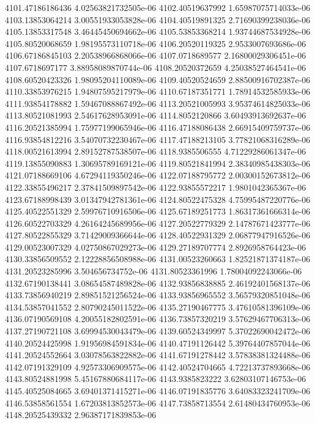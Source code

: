 {4101.47186186436 4.02563821732505e-06
4102.40519637992 1.65987075714033e-06
4103.13853064214 3.00551933053828e-06
4104.40519891325 2.71690399238036e-06
4105.13853317548 3.46445450694662e-06
4105.53853368214 1.93744687534928e-06
4105.80520068659 1.98195573110718e-06
4106.20520119325 2.9533007693686e-06
4106.67186845103 2.20538966868066e-06
4107.0718689577 2.16800029306451e-06
4107.6718697177 3.88958089870744e-06
4108.20520372659 4.25038527464541e-06
4108.60520423326 1.98095204110089e-06
4109.40520524659 2.88500916702387e-06
4110.33853976215 1.94807595217979e-06
4110.67187351771 1.78914532585933e-06
4111.93854178882 1.59467088867492e-06
4113.20521005993 3.95374614825033e-06
4113.80521081993 2.54617628953091e-06
4114.8052120866 3.60493913692637e-06
4116.20521385994 1.75977199065946e-06
4116.47188086438 2.66915409759737e-06
4116.93854812216 3.54070732230467e-06
4117.47188213105 3.77821068316289e-06
4118.00521613994 2.89152787538507e-06
4118.9385506555 4.71229286061347e-06
4119.13855090883 1.30695789169121e-06
4119.80521841994 2.38340985438303e-06
4121.07188669106 4.67294119350246e-06
4122.07188795772 2.00300152673812e-06
4122.33855496217 2.37841509897542e-06
4122.93855572217 1.9801042365367e-06
4123.67188998439 3.01347942781361e-06
4124.80522475328 4.75995487220776e-06
4125.40522551329 2.59976710916506e-06
4125.67189251773 1.86317361666314e-06
4126.60522703329 4.26164245689956e-06
4127.20522779329 2.14787671423777e-06
4127.80522855329 3.71429009366644e-06
4128.40522931329 2.06877947916526e-06
4129.00523007329 4.02750867029273e-06
4129.27189707774 2.8926958764423e-06
4130.33856509552 2.12228856508988e-06
4131.00523260663 1.82521871374187e-06
4131.20523285996 3.504656734752e-06
4131.80523361996 1.78004092243066e-06
4132.67190138441 3.08654587489828e-06
4132.93856838885 2.46192401568137e-06
4133.73856940219 2.89851521256524e-06
4133.93856965552 3.56579320851048e-06
4134.53857041552 2.80790245011522e-06
4135.27190467775 3.47610581396109e-06
4136.07190569108 4.20055182802591e-06
4136.73857320219 3.57629467706313e-06
4137.27190721108 3.69994530043479e-06
4139.60524349997 5.37022690042472e-06
4140.20524425998 1.91956984591834e-06
4140.47191126442 5.39764407857044e-06
4141.20524552664 3.03078563822882e-06
4141.67191278442 3.57838381324488e-06
4142.07191329109 4.92573306909575e-06
4142.40524704665 4.72213737893668e-06
4143.80524881998 5.45167880684117e-06
4143.9385823222 3.62803107146753e-06
4145.40525084665 3.69401371415271e-06
4146.07191835776 3.64083323241709e-06
4146.53858561554 1.67203813852573e-06
4147.73858713554 2.61480434760953e-06
4148.20525439332 2.96387171839853e-06
}

